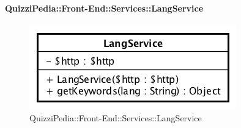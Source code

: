 \paragraph{QuizziPedia::Front-End::Services::LangService}

\label{QuizziPedia::Front-End::Services::LangService}
\begin{figure}[ht]
	\centering
	\includegraphics[scale=0.60]{UML/Classi/Front-End/QuizziPedia_Front-end_Services_LangService.png}
	\caption{QuizziPedia::Front-End::Services::LangService}
\end{figure}\FloatBarrier

